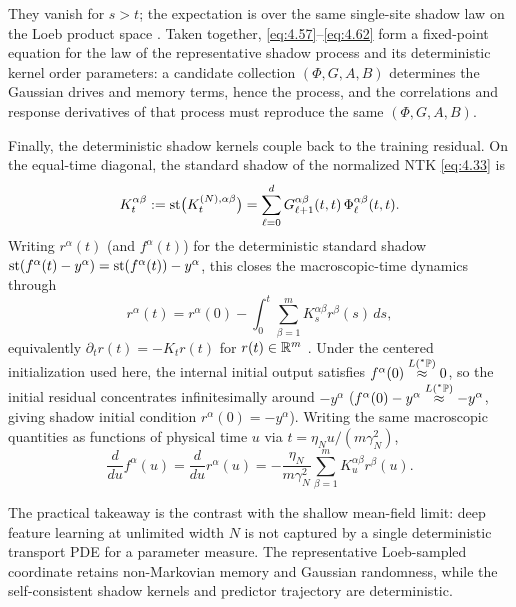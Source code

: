 They vanish for $s > t$; the expectation is over the same single-site shadow law on the Loeb product space \cite[Sec.~3.2]{bordelon2022self}. Taken together, \eqref{eq:4.57}--\eqref{eq:4.62} form a fixed-point equation for the law of the representative shadow process and its deterministic kernel order parameters: a candidate collection $(\Phi, G, A, B)$ determines the Gaussian drives and memory terms, hence the process, and the correlations and response derivatives of that process must reproduce the same $(\Phi, G, A, B)$.

Finally, the deterministic shadow kernels couple back to the training residual. On the equal-time diagonal, the standard shadow of the normalized NTK \eqref{eq:4.33} is
\begin{equation}\label{eq:4.63}
K_t^{\alpha\beta} := \operatorname{st}\bigl(K_t^{(N),\alpha\beta}\bigr) = \sum_{\ell=0}^d G_{\ell+1}^{\alpha\beta}(t, t)\,\Phi_\ell^{\alpha\beta}(t, t).
\end{equation}
Writing $r^\alpha(t)$ (and $f^\alpha(t)$) for the deterministic standard shadow $\operatorname{st}(f^\alpha(t) - y^\alpha) = \operatorname{st}(f^\alpha(t)) - y^\alpha$, this closes the macroscopic-time dynamics through
\begin{equation}\label{eq:4.64}
r^\alpha(t) = r^\alpha(0) - \int_0^t \sum_{\beta=1}^m K_s^{\alpha\beta} r^\beta(s)\,ds,
\end{equation}
equivalently $\partial_t r(t) = -K_t r(t)$ for $r(t) \in \mathbb{R}^m$ \cite[Eq.~(3)]{bordelon2022self}. Under the centered initialization used here, the internal initial output satisfies $f^\alpha(0) \stackrel{L({}^*\mathbb{P})}{\approx} 0$, so the initial residual concentrates infinitesimally around $-y^\alpha$ ($f^\alpha(0) - y^\alpha \stackrel{L({}^*\mathbb{P})}{\approx} -y^\alpha$, giving shadow initial condition $r^\alpha(0) = -y^\alpha$). Writing the same macroscopic quantities as functions of physical time $u$ via $t = \eta_N u / (m\gamma_N^2)$,
\begin{equation}\label{eq:4.65}
\frac{d}{du}f^\alpha(u) = \frac{d}{du}r^\alpha(u) = -\frac{\eta_N}{m\gamma_N^2}\sum_{\beta=1}^m K_u^{\alpha\beta} r^\beta(u).
\end{equation}

The practical takeaway is the contrast with the shallow mean-field limit: deep feature learning at unlimited width $N$ is not captured by a single deterministic transport PDE for a parameter measure. The representative Loeb-sampled coordinate retains non-Markovian memory and Gaussian randomness, while the self-consistent shadow kernels and predictor trajectory are deterministic.


